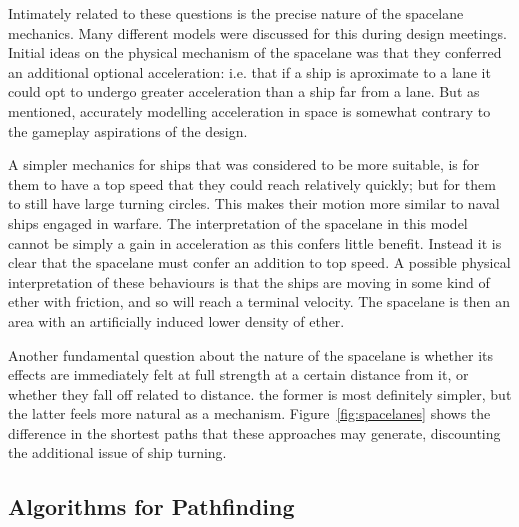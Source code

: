 Intimately related to these questions is the precise nature of the spacelane mechanics. Many different models were discussed for this during design meetings. Initial ideas on the physical mechanism of the spacelane was that they conferred an additional optional acceleration: i.e. that if a ship is aproximate to a lane it could opt to undergo greater acceleration than a ship far from a lane. But as mentioned, accurately modelling acceleration in space is somewhat contrary to the gameplay aspirations of the design. 

A simpler mechanics for ships that was considered to be more suitable, is for them to have a top speed that they could reach relatively quickly; but for them to still have large turning circles. This makes their motion more similar to naval ships engaged in warfare. The interpretation of the spacelane in this model cannot be simply a gain in acceleration as this confers little benefit. Instead it is clear that the spacelane must confer an addition to top speed. A possible physical interpretation of these behaviours is that the ships are moving in some kind of ether with friction, and so will reach a terminal velocity. The spacelane is then an area with an  artificially induced lower density of ether.

Another fundamental question about the nature of the spacelane is whether its effects are immediately felt at full strength at a certain distance from it, or whether they fall off related to distance. the former is most definitely simpler, but the latter feels more natural as a mechanism. Figure~\ref{fig:spacelanes} shows the difference in the shortest paths that these approaches may generate, discounting the additional issue of ship turning.

\subsection{Algorithms for Pathfinding}


